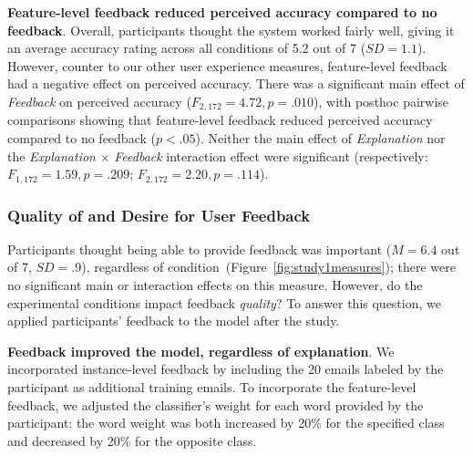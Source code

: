 
\textbf{Feature-level feedback reduced perceived accuracy compared to no feedback}.
%
Overall, participants thought the system worked fairly well, giving it an average accuracy rating across all conditions of 5.2 out of 7 ($SD=1.1$).
However, counter to our other user experience measures, feature-level feedback had a negative effect on perceived accuracy. There was a significant main effect of \textit{Feedback} on perceived accuracy ($F_{2,172}=4.72, p=.010$), with posthoc pairwise comparisons showing that feature-level feedback reduced perceived accuracy compared to no feedback ($p<.05$). Neither the main effect of \textit{Explanation} nor the \textit{Explanation} $\times$ \textit{Feedback} interaction effect were significant (respectively: $F_{1,172}=1.59, p=.209$; $F_{2,172}=2.20, p=.114$). 

\subsubsection{Quality of and Desire for User Feedback}
Participants thought being able to provide feedback was important ($M=6.4$ out of 7, $SD=.9$), regardless of condition~(Figure~\ref{fig:study1measures}); there were no significant main or interaction effects on this measure. However, do the experimental conditions impact feedback \textit{quality}? To answer this question, we applied participants' feedback to the model after the study.

\textbf{Feedback improved the model, regardless of explanation}.
We incorporated instance-level feedback by including the 20 emails labeled by the participant as additional training emails. To incorporate the feature-level feedback, we adjusted the classifier's weight for each word provided by the participant: the word weight was both increased by 20\% for the specified class and decreased by 20\% for the opposite class.

